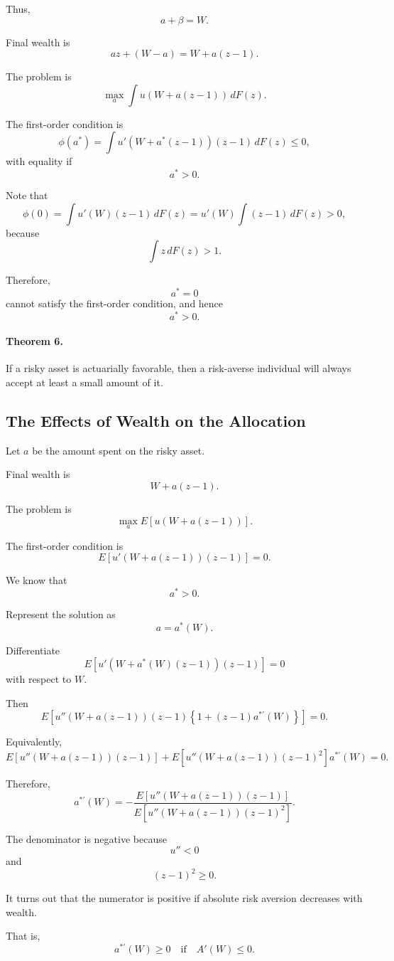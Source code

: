Thus,
\[
a+\beta=W.
\]

Final wealth is
\[
az+(W-a)
=
W+a(z-1).
\]

The problem is
\[
\max_a
\int u(W+a(z-1))\,dF(z).
\]

The first-order condition is
\[
\phi(a^*)
=
\int
u'(W+a^*(z-1))(z-1)\,dF(z)
\le 0,
\]
with equality if
\[
a^*>0.
\]

Note that
\[
\phi(0)
=
\int u'(W)(z-1)\,dF(z)
=
u'(W)
\int (z-1)\,dF(z)>0,
\]
because
\[
\int z\,dF(z)>1.
\]

Therefore,
\[
a^*=0
\]
cannot satisfy the first-order condition, and hence
\[
a^*>0.
\]

\paragraph{Theorem 6.}

If a risky asset is actuarially favorable, then a risk-averse individual will always accept at least a small amount of it.

\subsection{The Effects of Wealth on the Allocation}

Let \(a\) be the amount spent on the risky asset.

Final wealth is
\[
W+a(z-1).
\]

The problem is
\[
\max_a
E[u(W+a(z-1))].
\]

The first-order condition is
\[
E[u'(W+a(z-1))(z-1)]=0.
\]

We know that
\[
a^*>0.
\]

Represent the solution as
\[
a=a^*(W).
\]

Differentiate
\[
E[u'(W+a^*(W)(z-1))(z-1)]=0
\]
with respect to \(W\).

Then
\[
E\left[
u''(W+a(z-1))(z-1)
\left\{
1+(z-1)a^{*'}(W)
\right\}
\right]
=
0.
\]

Equivalently,
\[
E[u''(W+a(z-1))(z-1)]
+
E[u''(W+a(z-1))(z-1)^2]a^{*'}(W)
=
0.
\]

Therefore,
\[
a^{*'}(W)
=
-
\frac{
E[u''(W+a(z-1))(z-1)]
}{
E[u''(W+a(z-1))(z-1)^2]
}.
\]

The denominator is negative because
\[
u''<0
\]
and
\[
(z-1)^2\ge 0.
\]

It turns out that the numerator is positive if absolute risk aversion decreases with wealth.

That is,
\[
a^{*'}(W)\ge 0
\quad
\text{if}
\quad
A'(W)\le 0.
\]

